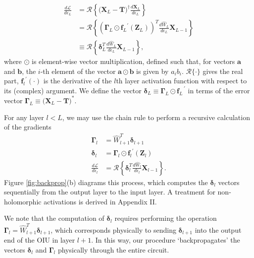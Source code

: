 \begin{align}
\frac{d\mathcal{L}}{d\epsilon_L} &= \mathcal{R}\left\{\big(\mathbf{X}_L - \mathbf{T} \big)^\dagger \frac{d\mathbf{X}_L}{d\epsilon_L} \right\}\\
    &= \mathcal{R}\left\{ \left(  \bm{\Gamma}_L \odot {\mathbf{f}_L}^{'}(\mathbf{Z}_{L}) \right)^T \frac{d \hat{W}_L}{d\epsilon_L}\mathbf{X}_{L-1} \right\}\\ 
    &\equiv \mathcal{R}\left\{ \boldsymbol{\delta}_L^T \frac{d \hat{W}_L}{d\epsilon_L} \mathbf{X}_{L-1} \right\},
\label{eq:backprop_L}
\end{align}
where $\odot$ is element-wise vector multiplication, defined such that, for vectors $\mathbf{a}$ and $\mathbf{b}$, the $i$-th element of the vector $\mathbf{a} \odot \mathbf{b}$ is given by $a_i b_i$. $\mathcal{R}\{\cdot\}$ gives the real part, ${\mathbf{f}_l}^{'}(\cdot)$ is the derivative of the $l$th layer activation function with respect to its (complex) argument.  We define the vector $\bm{\delta}_L \equiv \bm{\Gamma}_L \odot {\mathbf{f}_L}^{\,'}$ in terms of the error vector $\bm{\Gamma}_L \equiv \big(\mathbf{X}_L - \mathbf{T} \big)^*$.

For any layer $l < L$, we may use the chain rule to perform a recursive calculation of the gradients
\begin{align}
\bm{\Gamma}_l &= \hat{W}^T_{l+1} \bm{\delta}_{l+1} \label{eq:backprop_general_Gamma}
\\
\bm{\delta}_l &= \bm{\Gamma}_l \odot {\mathbf{f}_l}^{'}(\mathbf{Z}_{l}) \label{eq:backprop_general2}
\\
\frac{d\mathcal{L}}{d\epsilon_l} &= \mathcal{R}\left\{ \bm{\delta}_l^T \frac{d \hat{W}_l}{d\epsilon_l} \mathbf{X}_{l-1} \right\}.
\label{eq:backprop_general}
\end{align}
Figure \ref{fig:backprop}(b) diagrams this process, which computes the $\bm{\delta}_l$ vectors sequentially from the output layer to the input layer.  A treatment for non-holomorphic activations is derived in Appendix II.

We note that the computation of $\bm{\delta}_l$ requires performing the operation $\bm{\Gamma}_l = \hat{W}^T_{l+1} \bm{\delta}_{l+1}$, which corresponds physically to sending $\bm{\delta}_{l+1}$ into the output end of the OIU in layer $l+1$.  In this way, our procedure `backpropagates' the vectors $\bm{\delta}_l$ and $\bm{\Gamma}_l$ physically through the entire circuit.


